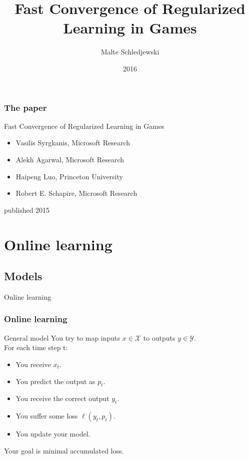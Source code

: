 \documentclass{beamer}
\title{Fast Convergence of Regularized Learning in Games}
\author{Malte Schledjewski}
\institute{Saarbrücken Graduate School of Computer Science}
\date{2016}
\begin{document}
	
\frame{\titlepage}

\begin{frame}
	\frametitle{The paper}
	\begin{block}{Fast Convergence of Regularized Learning in Games}
		\begin{itemize}
			\item Vasilis Syrgkanis, Microsoft Research
			\item Alekh Agarwal, Microsoft Research
			\item Haipeng Luo, Princeton University
			\item Robert E. Schapire, Microsoft Research
		\end{itemize}
		published 2015
	\end{block}
\end{frame}


\section{Online learning}
\subsection{Models}
\begin{frame}[c]
	\begin{center}
		\Huge Online learning
	\end{center}
\end{frame}


\begin{frame}
	\frametitle{Online learning}
	\begin{block}{General model}
		You try to map inputs $ x \in \mathcal{X}$ to outputs $y \in \mathcal{Y}$.\\  \pause
		For each time step t: \pause
		\begin{itemize}
			\item You receive $x_t$. \pause 
			\item You predict the output as $p_t$. \pause
			\item You receive the correct output $y_t$. \pause
			\item You suffer some loss $\ell(y_t,p_t)$. \pause
			\item You update your model. \pause
		\end{itemize}
		
		Your goal is minimal accumulated loss.
	\end{block}
\end{frame}
\end{document}
